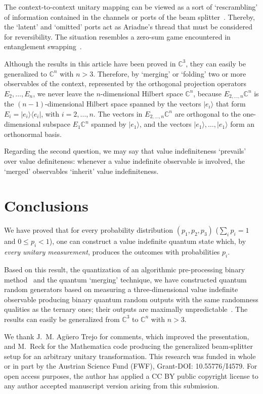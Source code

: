 \documentclass[%
 superscriptaddress,
  preprint,
 showpacs,
 showkeys,
 nofootinbib,
  amsmath,amssymb,
  aps,
 pra,
  longbibliography,
  floatfix,
 ]{revtex4-2}
\theoremstyle{definition}
\newcommand{\C}{\mathbb{C}}
\begin{document}
The context-to-context unitary mapping can be viewed as a sort of `rescrambling'
of information contained in the channels or ports of the beam splitter~\cite{schrodinger-gwsidqm2,zeil-99}.
Thereby, the `latent' and `omitted' ports act as Ariadne's thread that must be considered for reversibility.
The situation resembles a zero-sum game encountered in
entanglement swapping~\cite{BBCJPW,peres-DelayedChoiceEntanglementSwapping}.


Although the results in this article have been proved in  $\C^3$, they can easily be generalized to $\C^n$ with $ n>3$.
Therefore, by `merging'
or `folding'
two or more observables of the context, represented by the orthogonal projection operators $E_2,\ldots , E_n$,
we never leave the $n$-dimensional Hilbert space $\C^n$,
because $E_{2,\ldots,n}\C^n$ is the $(n-1)$-dimensional Hilbert space spanned by the vectors
$\vert e_i\rangle$ that form
$E_i=\vert e_i\rangle \langle e_i \vert$, with $i=2,\ldots, n$.
The vectors in $E_{2,\ldots,n}\C^n$ are orthogonal to the one-dimensional subspace $E_{1}\C^n$ spanned by $\vert e_1\rangle$,
and the vectors $\vert e_1\rangle,\ldots ,\vert e_1\rangle$ form an orthonormal basis.

Regarding the second question, we may say that value indefiniteness `prevails' over value definiteness: whenever a value indefinite observable is involved, the `merged' observables `inherit' value indefiniteness.


\section{Conclusions}


We have proved that
for every probability distribution $(p_1,p_2,p_3)$ ($\sum_{i}p_i=1$ and $0\le  p_i < 1$), one can construct a value indefinite quantum state which, by {\it every unitary  measurement}, produces the
outcomes with probabilities $p_i$.


Based on this result, the quantization of an algorithmic pre-processing binary method~\cite{CALUDE202131} and the quantum `merging' technique, we have constructed quantum random generators based on measuring a three-dimensional value indefinite observable producing binary quantum random outputs with the same randomness qualities as the ternary ones; their outputs are maximally unpredictable~\cite{2014-nobit}. The results can easily be generalized from $\C^3$ to $\C^n$ with $ n>3$.


\begin{acknowledgments}
We thank J.~M. Ag\"{u}ero Trejo for comments, which improved the presentation, and M.~Reck for the Mathematica code producing the generalized beam-splitter setup for an arbitrary unitary transformation.
This research was funded in whole or in part by the Austrian Science Fund (FWF), Grant-DOI: 10.55776/I4579.
For open access purposes, the author has applied a CC BY public copyright license to any author accepted manuscript version arising from this submission.
\end{acknowledgments}




\end{document}
